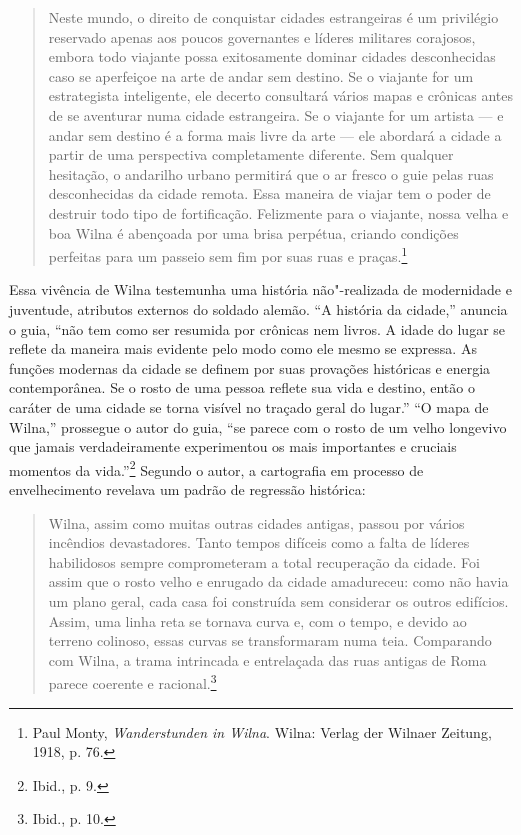 %

\begin{quote}
Neste mundo, o direito de conquistar cidades estrangeiras é um
privilégio reservado apenas aos poucos governantes e líderes militares
corajosos, embora todo viajante possa exitosamente dominar cidades
desconhecidas caso se aperfeiçoe na arte de andar sem destino. Se o
viajante for um estrategista inteligente, ele decerto consultará vários
mapas e crônicas antes de se aventurar numa cidade estrangeira. Se o
viajante for um artista --- e andar sem destino é a forma mais livre da
arte --- ele abordará a cidade a partir de uma perspectiva completamente
diferente. Sem qualquer hesitação, o andarilho urbano permitirá que o ar
fresco o guie pelas ruas desconhecidas da cidade remota. Essa maneira de
viajar tem o poder de destruir todo tipo de fortificação. Felizmente
para o viajante, nossa velha e boa Wilna é abençoada por uma brisa
perpétua, criando condições perfeitas para um passeio sem fim por suas
ruas e praças.\footnote{Paul Monty, \emph{Wanderstunden in Wilna}.
  Wilna: Verlag der Wilnaer Zeitung, 1918, p. 76.}
\end{quote}

Essa vivência de Wilna testemunha uma história não"-realizada de
modernidade e juventude, atributos externos do soldado alemão. ``A
história da cidade,'' anuncia o guia, ``não tem como ser resumida por
crônicas nem livros. A idade do lugar se reflete da maneira mais
evidente pelo modo como ele mesmo se expressa. As funções modernas da
cidade se definem por suas provações históricas e energia contemporânea.
Se o rosto de uma pessoa reflete sua vida e destino, então o caráter de
uma cidade se torna visível no traçado geral do lugar.'' ``O mapa de
Wilna,'' prossegue o autor do guia, ``se parece com o rosto de um velho
longevivo que jamais verdadeiramente experimentou os mais importantes e
cruciais momentos da vida.''\footnote{Ibid., p. 9.} Segundo o autor, a
cartografia em processo de envelhecimento revelava um padrão de
regressão histórica:

\begin{quote}
Wilna, assim como muitas outras cidades antigas, passou por vários
incêndios devastadores. Tanto tempos difíceis como a falta de líderes
habilidosos sempre comprometeram a total recuperação da cidade. Foi
assim que o rosto velho e enrugado da cidade amadureceu: como não havia
um plano geral, cada casa foi construída sem considerar os outros
edifícios. Assim, uma linha reta se tornava curva e, com o tempo, e
devido ao terreno colinoso, essas curvas se transformaram numa teia.
Comparando com Wilna, a trama intrincada e entrelaçada das ruas antigas
de Roma parece coerente e racional.\footnote{Ibid., p. 10.}
\end{quote}

